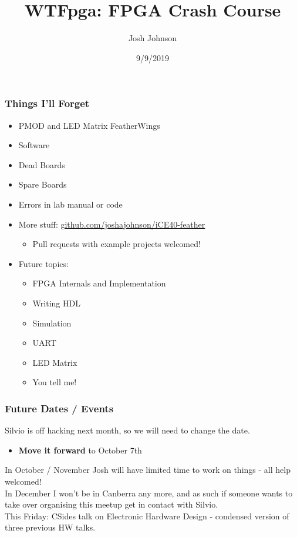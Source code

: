 \documentclass[t]{beamer}
\title[WTFpga]{WTFpga: FPGA Crash Course} %
\author{Josh Johnson} %
\institute[] %
{ \\ %
\medskip
\textit{} %
}
\date{9/9/2019} %
\begin{document}
\begin{frame}
\titlepage %
\end{frame}


\begin{frame}
\frametitle{Things I'll Forget}
\begin{itemize}
	\item PMOD and LED Matrix FeatherWings 
	\item Software
	\item Dead Boards
	\item Spare Boards
	\item Errors in lab manual or code
	\item More stuff: \url{github.com/joshajohnson/iCE40-feather}
	\begin{itemize}
		\item Pull requests with example projects welcomed!
	\end{itemize}
	\item Future topics:
	\begin{itemize}
		\item FPGA Internals and Implementation
		\item Writing HDL 
		\item Simulation
		\item UART
		\item LED Matrix
		\item You tell me!
	\end{itemize}
\end{itemize}
\end{frame}


\begin{frame}
\frametitle{Future Dates / Events}
Silvio is off hacking next month, so we will need to change the date.
\begin{itemize}
	\item \textbf{Move it forward} to October 7th
\end{itemize}

\vspace{5mm}
In October / November Josh will have limited time to work on things - all help welcomed!\\[10pt]

In December I won't be in Canberra any more, and as such if someone wants to take over organising this meetup get in contact with Silvio. \\[10pt]

This Friday: CSides talk on Electronic Hardware Design - condensed version of three previous HW talks.
\end{frame}
\end{document}
